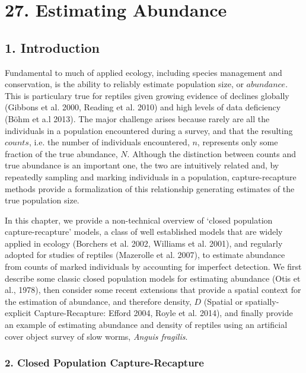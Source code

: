 \documentclass{book}
\begin{document}
\chapter*{27. Estimating Abundance\\
          }

\section*{1. Introduction}

Fundamental to much of applied ecology, including species management
and conservation, is the ability to reliably estimate population size,
or $abundance$. This is particulary true for reptiles given growing
evidence of declines globally (Gibbons et al. 2000, Reading et
al. 2010) and high levels of data deficiency (B{\"o}hm et a.l 2013). The 
major challenge arises because rarely are all the individuals in a 
population encountered during a survey, and that the
resulting $counts$, i.e. the number of individuals encountered, $n$,
represents only some fraction of the true abundance, $N$. Although the
distinction between counts and true abundance is an important one, the
two are intuitively related and, by repeatedly sampling and marking
individuals in a population, capture-recapture methods provide a
formalization of this relationship generating estimates of the true
population size.

In this chapter, we provide a non-technical overview of `closed
population capture-recapture' models, a class of well established
models that are widely applied in ecology (Borchers et al. 2002,
Williams et al. 2001), and regularly adopted for studies of reptiles
(Mazerolle et al. 2007), to estimate abundance from counts of marked
individuals by accounting for imperfect detection. We first describe
some classic closed population models for estimating abundance (Otis
et al., 1978), then consider some recent extensions that provide a
spatial context for the estimation of abundance, and therefore
density, $D$ (Spatial or spatially-explicit Capture-Recapture: Efford
2004, Royle et al. 2014), and finally provide an example of estimating
abundance and density of reptiles using an artificial cover object
survey of slow worms, \textit{Anguis fragilis}.

\subsection*{2. Closed Population Capture-Recapture}
\end{document}
